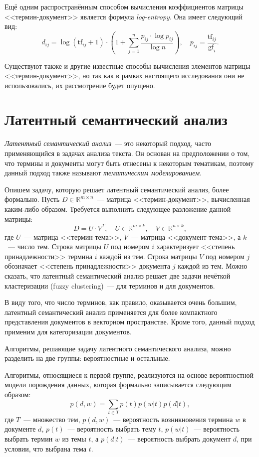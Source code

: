 Ещё одним распространённым способом вычисления коэффициентов
матрицы <<термин-документ>> является формула \textit{log-entropy}.
Она имеет следующий вид:
\begin{equation}\label{eq:log_entropy}
    d_{ij} = \log{(\mathrm{tf}_{ij} + 1)} \cdot
    (1 + \sum_{j=1}^{n} \frac{p_{ij} \cdot \log{p_{ij}}}{\log{n}}),\quad
    p_{ij} = \frac{\mathrm{tf}_{ij}}{\mathrm{gf}_i}.
\end{equation}

Существуют также и другие известные способы вычисления элементов
матрицы <<термин-документ>>, но так как в рамках настоящего исследования
они не использовались, их рассмотрение будет опущено.

\section{Латентный семантический анализ}
\label{sec:latent_semantic_analysis}
\textit{Латентный семантический анализ}~--- это некоторый подход,
часто применяющийся в задачах анализа текста. Он основан на
предположении о том, что термины и документы могут быть отнесены
к некоторым тематикам, поэтому данный подход также называют
\textit{тематическим моделированием}.

Опишем задачу, которую решает латентный семантический анализ,
более формально. Пусть $D \in \mathbb{R}^{m \times n}$~--- матрица 
<<термин-документ>>, вычисленная каким-либо образом. Требуется
выполнить следующее разложение данной матрицы:
\[
    D = U \cdot V^T,\quad U \in \mathbb{R}^{m \times k},\quad V \in \mathbb{R}^{n \times k},
\]
где $U$~--- матрица <<термин-тема>>, $V$~--- матрица <<документ-тема>>,
а $k$~--- число тем. Строка матрицы $U$ под номером $i$ 
характеризует <<степень принадлежности>> термина $i$ 
каждой из тем. Строка матрицы $V$ под номером $j$ обозначает
<<степень принадлежности>> документа $j$ каждой из тем.
Можно сказать, что латентный семантический анализ решает
две задачи нечёткой кластеризации (fuzzy clustering)~--- для
терминов и для документов.

В виду того, что число терминов, как правило,
оказывается очень большим, латентный семантический анализ
применяется для более компактного представления 
документов в векторном пространстве. Кроме того, данный подход
применим для категоризации документов.

Алгоритмы, решающие задачу латентного семантического анализа,
можно разделить на две группы: вероятностные и остальные.

Алгоритмы, относящиеся к первой группе, реализуются на
основе вероятностной модели порождения данных, которая
формально записывается следующим образом:
\[
    p(d, w) = \sum_{t \in T} p(t)p(w|t)p(d|t),
\]
где $T$~--- множество тем, $p(d, w)$~--- вероятность возникновения
термина $w$ в документе $d$, $p(t)$~--- вероятность выбрать тему $t$,
$p(w|t)$~--- вероятность выбрать термин $w$ из темы $t$, а
$p(d|t)$~--- вероятность выбрать документ $d$, при условии, что
выбрана тема $t$.

